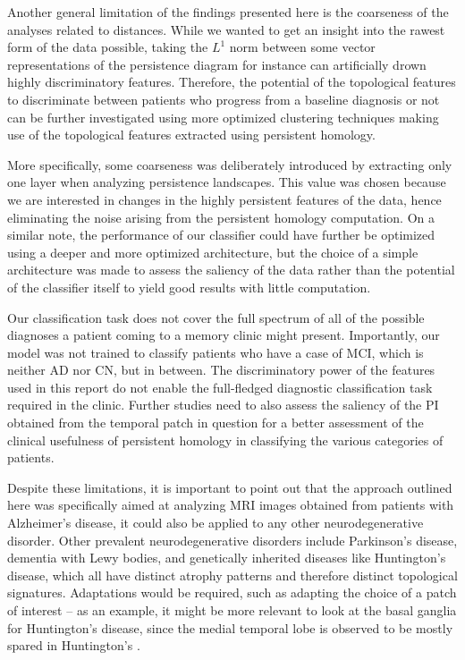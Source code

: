 \documentclass{article}
\begin{document}
Another general limitation of the findings presented here is the coarseness of the analyses related
to distances. While we wanted to get an insight into the rawest form of the data possible, taking
the $L^1$ norm between some vector representations of the persistence diagram for instance can
artificially drown highly discriminatory features. Therefore, the potential of the topological
features to discriminate between patients who progress from a baseline diagnosis or not can be
further investigated using more optimized clustering techniques making use of the topological
features extracted using persistent homology.

More specifically, some coarseness was deliberately introduced by extracting only one layer when
analyzing persistence landscapes. This value was chosen because we are interested in changes in the
highly persistent features of the data, hence eliminating the noise arising from the persistent
homology computation. On a similar note, the performance of our classifier could have further be
optimized using a deeper and more optimized architecture, but the choice of a simple architecture
was made to assess the saliency of the data rather than the potential of the classifier itself to
yield good results with little computation.

Our classification task does not cover the full spectrum of all of the possible diagnoses a patient
coming to a memory clinic might present. Importantly, our model was not trained to classify patients
who have a case of MCI, which is neither AD nor CN, but in between. The
discriminatory power of the features used in this report do not enable the full-fledged
diagnostic classification task required in the clinic. Further studies need to also assess the
saliency of the PI obtained from the temporal patch in question for a better assessment of the
clinical usefulness of persistent homology in classifying the various categories of patients.

Despite these limitations, it is important to point out that the approach outlined here was
specifically aimed at analyzing MRI images obtained from patients with Alzheimer's disease, it could
also be applied to any other neurodegenerative disorder. Other prevalent neurodegenerative disorders
include Parkinson's disease, dementia with Lewy bodies, and genetically inherited diseases like
Huntington's disease, which all have distinct atrophy patterns and therefore distinct topological signatures.
Adaptations would be required, such as adapting the choice of a patch of interest -- as an example, it
might be more relevant to look at the basal ganglia for Huntington's disease, since the medial
temporal lobe is observed to be mostly spared in Huntington's
\citep{kuhl1982cerebral, halliday1998regional, kassubek2004topography}.
\end{document}
